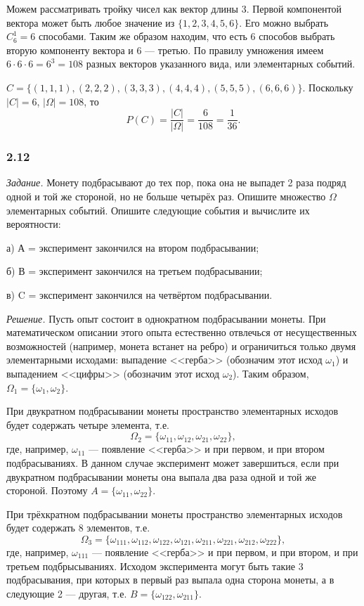 \documentclass{book}
\begin{document}
Можем рассматривать тройку чисел как вектор длины 3. Первой компонентой вектора может быть любое значение из $\{1, 2, 3, 4, 5, 6\}$. Его можно выбрать $C_6^1=6$ способами. Таким же образом находим, что есть 6 способов выбрать вторую компоненту вектора и 6 --- третью. По правилу умножения имеем $6\cdot 6\cdot 6=6^3=108$ разных векторов указанного вида, или элементарных событий.

$C=\{(1, 1, 1), (2, 2, 2), (3, 3, 3), (4, 4, 4), (5, 5, 5), (6, 6, 6)\}$. Поскольку $|C|=6$, $|\Omega|=108$, то $$P(C)=\frac{|C|}{|\Omega|}=\frac{6}{108}=\frac{1}{36}.$$

\subsubsection*{2.12}

\textit{Задание.} Монету подбрасывают до тех пор, пока она не выпадет 2 раза подряд одной и той же стороной, но не больше четырёх раз. Опишите множество $\Omega$ элементарных событий. Опишите следующие события и вычислите их вероятности:

а) А = { эксперимент закончился на втором подбрасывании};

б) В = { эксперимент закончился на третьем подбрасывании};

в) C = { эксперимент закончился на четвёртом подбрасывании}.

\textit{Решение.}  Пусть опыт состоит в однократном подбрасывании монеты. При математическом описании этого опыта естественно отвлечься от несущественных возможностей (например, монета встанет на ребро) и ограничиться только двумя элементарными исходами: выпадение <<герба>> (обозначим этот исход $\omega_1$) и выпадением <<цифры>> (обозначим этот исход $\omega_2$). Таким образом, $\Omega_1=\{\omega_1, \omega_2\}$.

При двукратном подбрасывании монеты пространство элементарных исходов будет содержать четыре элемента, т.е. $$\Omega_2=\{\omega_{11}, \omega_{12}, \omega_{21}, \omega_{22}\},$$ где, например, $\omega_{11}$ --- появление <<герба>> и при первом, и при втором подбрасываниях. В данном случае эксперимент может завершиться, если при двукратном подбрасывании монеты она выпала два раза одной и той же стороной. Поэтому $A=\{\omega_{11}, \omega_{22}\}$.

При трёхкратном подбрасывании монеты пространство элементарных исходов будет содержать 8 элементов, т.е. $$\Omega_3=\{\omega_{111}, \omega_{112}, \omega_{122}, \omega_{121}, \omega_{211}, \omega_{221}, \omega_{212}, \omega_{222}\},$$ где, например, $\omega_{111}$ --- появление <<герба>> и при первом, и при втором, и при третьем подбрысываниях. Исходом эксперимента могут быть такие 3 подбрасывания, при которых в первый раз выпала одна сторона монеты, а в следующие 2 --- другая, т.е. $B=\{\omega_{122}, \omega_{211}\}$.
\end{document}
